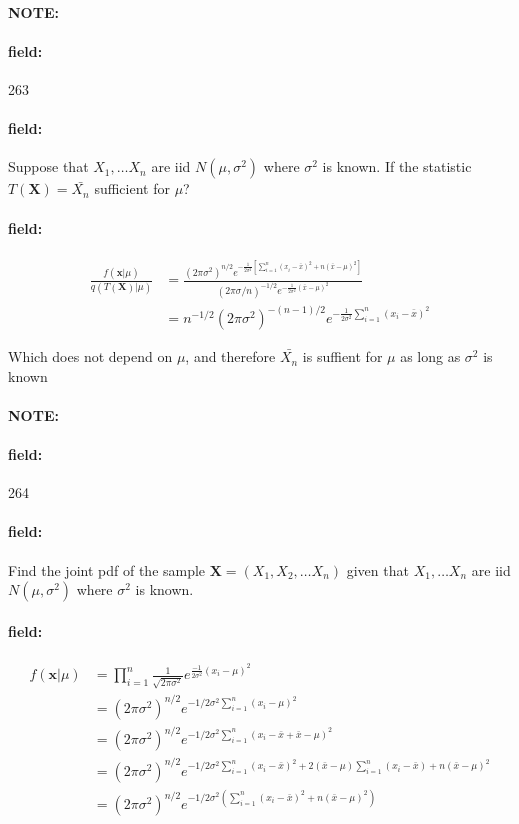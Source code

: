 \documentclass[12pt]{article}
\newenvironment{note}{\paragraph{NOTE:}}{}
\newenvironment{field}{\paragraph{field:}}{}
\begin{document}
\begin{note} \begin{field} \tiny 263 \end{field}
  \begin{field}
    Suppose that $X_1, \ldots X_n$ are iid $N(\mu,\sigma^2)$ where $\sigma^2$ is known. If the statistic $T(\mathbf{X}) = \bar{X_n}$ sufficient for $\mu$?
  \end{field}
  \begin{field}
    \begin{align*}
       \frac{f(\mathbf{x}|\mu)}{q(T(\mathbf{X})|\mu)} &=
       \frac{(2\pi\sigma^2)^{n/2}e^{-\frac{1}{2\sigma^2}[\sum_{i = 1}^n(x_i - \bar{x})^2 + n(\bar{x} - \mu)^2]}}{(2\pi\sigma/n)^{-1/2}e^{-\frac{1}{2\sigma^2}(\bar{x}-\mu)^2}}\\
       &= n^{-1/2}(2\pi\sigma^2)^{-(n-1)/2}e^{-\frac{1}{2\sigma^2}\sum_{i = 1}^n(x_i - \bar{x})^2}
    \end{align*}

    Which does not depend on $\mu$, and therefore $\bar{X_n}$ is suffient for $\mu$ as long as $\sigma^2$ is known
  \end{field}
\end{note}

\begin{note} \begin{field} \tiny 264 \end{field}
  \begin{field}
  Find the joint pdf of the sample $\mathbf{X} =(X_1, X_2, \ldots X_n)$ given that $X_1, \ldots X_n$ are iid $N(\mu,\sigma^2)$ where $\sigma^2$ is known.
  \end{field}
  \begin{field}
    \begin{align*}
      f(\mathbf{x}|\mu) &= \prod_{i = 1}^n \frac{1}{\sqrt{2\pi\sigma^2}} e^{\frac{-1}{2\sigma^2}(x_i - \mu)^2}\\
      &= (2\pi\sigma^2)^{n/2} e^{-1/2\sigma^2 \sum_{i = 1}^n (x_i - \mu)^2}\\
      &= (2\pi\sigma^2)^{n/2} e^{-1/2\sigma^2 \sum_{i = 1}^n (x_i - \bar{x} + \bar{x} - \mu)^2}\\
      &= (2\pi\sigma^2)^{n/2} e^{-1/2\sigma^2 \sum_{i = 1}^n (x_i - \bar{x})^2 + 2(\bar{x} - \mu)\sum_{i = 1}^n (x_i - \bar{x}) + n(\bar{x} - \mu)^2}\\
      &= (2\pi\sigma^2)^{n/2}e^{-1/2\sigma^2 (\sum_{i = 1}^n (x_i - \bar{x})^2 + n(\bar{x} - \mu)^2)}
    \end{align*}
  \end{field}
\end{note}
\end{document}
